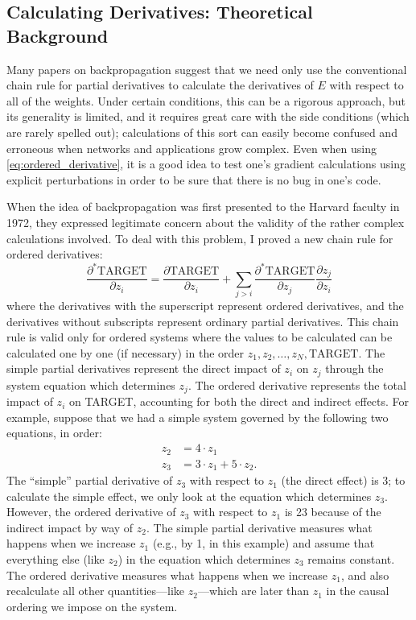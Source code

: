 \documentclass[journal]{IEEEtran} %
\begin{document}
\subsection{Calculating Derivatives: Theoretical Background}
Many papers on backpropagation suggest that we need only use the conventional chain rule for partial derivatives to calculate the derivatives of $E$ with respect to all of the weights. Under certain conditions, this can be a rigorous approach, but its generality is limited, and it requires great care with the side conditions (which are rarely spelled out); calculations of this sort can easily become confused and erroneous when networks and applications grow complex. Even when using \eqref{eq:ordered_derivative}, it is a good idea to test one's gradient calculations using explicit perturbations in order to be sure that there is no bug in one's code.

When the idea of backpropagation was first presented to the Harvard faculty in 1972, they expressed legitimate concern about the validity of the rather complex calculations involved. To deal with this problem, I proved a new chain rule for ordered derivatives:
\begin{equation}
    \frac{\partial^* \text{TARGET}}{\partial z_i} = \frac{\partial \text{TARGET}}{\partial z_i} + \sum_{j>i} \frac{\partial^* \text{TARGET}}{\partial z_j} \frac{\partial z_j}{\partial z_i} \label{eq:ordered_derivative}
\end{equation}
where the derivatives with the superscript represent ordered derivatives, and the derivatives without subscripts represent ordinary partial derivatives. This chain rule is valid only for ordered systems where the values to be calculated can be calculated one by one (if necessary) in the order $z_1, z_2, \dots, z_N, \text{TARGET}$. The simple partial derivatives represent the direct impact of $z_i$ on $z_j$ through the system equation which determines $z_j$. The ordered derivative represents the total impact of $z_i$ on TARGET, accounting for both the direct and indirect effects. For example, suppose that we had a simple system governed by the following two equations, in order:
\begin{align*}
    z_2 &= 4 \cdot z_1 \\
    z_3 &= 3 \cdot z_1 + 5 \cdot z_2.
\end{align*}
The ``simple'' partial derivative of $z_3$ with respect to $z_1$ (the direct effect) is 3; to calculate the simple effect, we only look at the equation which determines $z_3$. However, the ordered derivative of $z_3$ with respect to $z_1$ is 23 because of the indirect impact by way of $z_2$. The simple partial derivative measures what happens when we increase $z_1$ (e.g., by 1, in this example) and assume that everything else (like $z_2$) in the equation which determines $z_3$ remains constant. The ordered derivative measures what happens when we increase $z_1$, and also recalculate all other quantities---like $z_2$---which are later than $z_1$ in the causal ordering we impose on the system.
\end{document}
